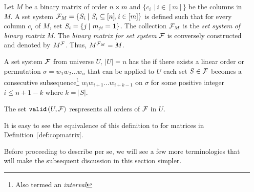 \begin{definition}%
  \label{def:matrixsetsystem}%
  Let $M$ be a binary matrix of order $n \times m$ and $\{c_i \mid i
  \in [m]\}$ be the columns in $M$.  A set system ${\cal F}_{M} = \{S_i
  \mid S_i \subseteq [n], i \in [m]\}$ is defined such that for every
  column $c_i$ of $M$, set $S_i = \{j \mid m_{ji} = \textbf{1} \}$. The
  collection ${\cal F}_M$ is the {\em set system of binary matrix} $M$. The
  {\em binary matrix for set system} ${\cal F}$ is conversely constructed
  and denoted by $M^{\cal F}$. Thus, $M^{{\cal F}_M} = M$.%
  \par\noindent%
  A set system ${\cal F}$ from universe $U$, $|U| = n$ has the {\em \cop}
  if there exists a linear order or permutation $\sigma = w_1w_2\ldots
  w_n$ that can be applied to $U$ \stt each set $S \in {\cal F}$ becomes a
  consecutive subsequence\footnote{Also termed an {\em interval}}
  $w_{i}w_{i+1}\ldots w_{i+k-1}$ on $\sigma$ for some positive integer
  $i \le n+1-k$ where $k = |S|$.
  \par\noindent%
  The set ${\tt valid}\left(U,{\cal F}\right)$ respresents all \COP orders of ${\cal F}$ in $U$.
  \dstop
\end{definition}

It is easy to see the equivalence of this definition to \COP for
matrices in Definition~\ref{def:copmatrix}.

Before proceeding to describe \PQRtree per se, we will see a few more
terminologies that will make the subsequent discussion in this section
simpler.

